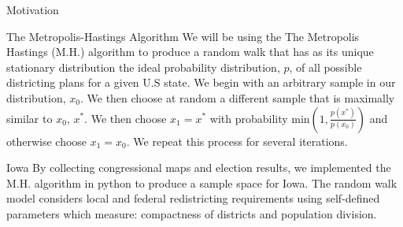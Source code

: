 \documentclass[leqno, handout]{beamer}
\theoremstyle{definition}
\begin{document}
\begin{frame}
\begin{columns}[t]
\begin{column}[t]{.25\linewidth}
\begin{block}{Motivation}
\end{block}

\begin{block}{The Metropolis-Hastings Algorithm}
We will be using the The Metropolis Hastings (M.H.) algorithm to produce a random walk that has as its unique stationary distribution the ideal probability distribution, $p$, of all possible districting plans for a given U.S state.
We begin with an arbitrary sample in our distribution, $x_0$. We then choose at random a different sample that is maximally similar to $x_0$, $x^*$. We then choose $x_1=x^*$ with probability min$(1, \frac{p(x^*)}{p(x_0)})$ and otherwise choose $x_1=x_0$. We repeat this process for several iterations.     

\end{block}

\begin{block}{Iowa}
By collecting congressional maps and election results, we
implemented the M.H. algorithm in python to produce a sample space for Iowa. The random walk model considers local
and federal redistricting requirements using self-defined parameters which measure: compactness of districts and population division. 


\end{block}


\end{column}




\end{columns}
\end{frame}
\end{document}
